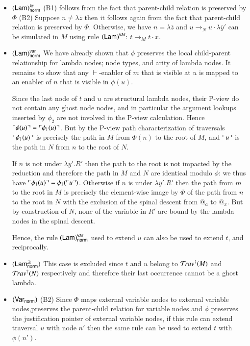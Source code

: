 \documentclass{elsarticle}
\theoremstyle{plain}
\theoremstyle{definition}
\theoremstyle{remark}
\newcommand{\ghostlmd}{{\lambda\!\!\lambda}}
\newcommand{\normalizing}{{\sf norm}}
\newcommand{\enables}{\vdash} %
\begin{document}
\begin{description}[itemindent=0em,leftmargin=0cm]
\begin{itemize}[itemindent=0.5em, leftmargin=0.5em]
    \item $\rulename{Lam}^@_\normalizing$
    (B1) follows from the fact that parent-child relation is preserved by $\Phi$
    (B2) Suppose $n \neq \lambda\overline{z}$ then it follows again from the fact that parent-child relation is preserved by $\Phi$.
    Otherwise, we have $n = \lambda\overline{z}$ and $u \rightarrow_N u \cdot \lambda\overline{y}'$ can be simulated in $M$ using rule $\mathbf{({\sf Lam})}^{\sf var}$: $t \rightarrow_M t \cdot x$.

    \item $\rulename{Lam}^{\sf var}_\normalizing$
    We have already shown that  $\phi$ preserves the local child-parent relationship for lambda nodes; node types, and arity of lambda nodes.
    It remains to show that any $\enables$-enabler of $m$ that is visible at  $u$ is mapped to an enabler of $n$ that is visible in $\phi(u)$.

    Since the last node of $t$ and $u$ are structural lambda nodes, their P-view do not contain any ghost node nodes, and in particular the argument lookups inserted by $\phi_2$ are not involved in the P-view calculation. Hence $\ulcorner \phi(u) \urcorner = \ulcorner \phi_1(u) \urcorner$.
    But by the P-view path characterization of traversals $\ulcorner \phi_1(u) \urcorner$ is precisely the path in $M$ from $\Phi(n)$ to the root of $M$,
    and $\ulcorner u \urcorner$ is the path in $N$ from $n$ to the root of $N$.

    If $n$ is not under $\lambda\overline{y}'.R'$ then the path to the root is not impacted by the reduction and therefore the path in $M$ and $N$ are identical modulo $\phi$: we thus have $\ulcorner \phi_1(u) \urcorner = \phi_1(\ulcorner u \urcorner)$.
    Otherwise if $n$ is under $\lambda\overline{y}'.R'$ then the path from $m$ to the root in $M$ is precisely the element-wise image by $\Phi$ of the path from $n$ to the root in $N$ with the exclusion of the spinal descent from $@_a$ to $@_x$. But by construction of $N$, none of the variable in $R'$ are bound by the lambda nodes in the spinal descent.

    Hence, the rule $\rulename{Lam}^{\sf var}_\normalizing$ used to extend  $u$ can also be used to extend $t$, and reciprocally.

    \item $\rulename{Lam^\ghostlmd_\normalizing}$
    This case is excluded since $t$ and $u$ belong to $\mathcal{T}\!rav^\dagger(M)$ and
    $\mathcal{T}\!rav^\dagger(N)$ respectively and therefore their last occurrence cannot be a ghost lambda.

    \item $\rulename{Var_\normalizing}$
    (B2) Since $\Phi$ maps external variable nodes to external variable nodes,preserves the parent-child relation for variable nodes and $\phi$ preserves the justification pointer of external variable nodes, if this rule can extend traversal $u$ with node $n'$ then the same rule can be used to extend $t$ with $\phi(n')$.


\end{itemize}
\end{description}
\end{document}
